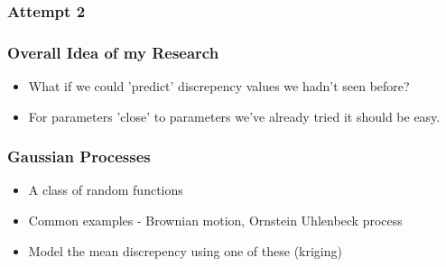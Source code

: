 \documentclass{beamer}
\begin{document}
\begin{frame}
    \frametitle{Attempt 2}
    \begin{figure}
        \centering
        \end{figure}


\end{frame}

\begin{frame}
    \frametitle{Overall Idea of my Research}
    \begin{itemize}
        \item What if we could 'predict' discrepency values we hadn't seen before?
        \item <2-> For parameters 'close' to parameters we've already tried it should be easy.
    \end{itemize}
\end{frame}

\begin{frame}
    \frametitle{Gaussian Processes}
    \begin{itemize}
        \item A class of random functions
        \item Common examples - Brownian motion, Ornstein Uhlenbeck process
        \item Model the mean discrepency using one of these (kriging)
    \end{itemize}
\end{frame}
\end{document}
